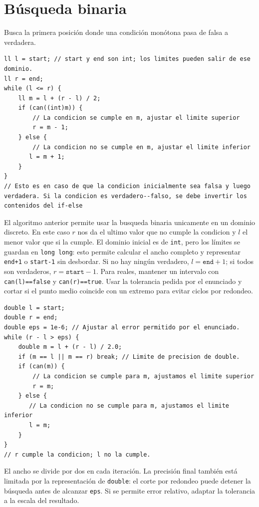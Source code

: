 \section{B\'usqueda binaria}

Busca la primera posici\'on donde una condici\'on mon\'otona pasa de falsa a
verdadera. 



\begin{lstlisting}[style=cpp]
ll l = start; // start y end son int; los limites pueden salir de ese dominio.
ll r = end;
while (l <= r) {
    ll m = l + (r - l) / 2;
    if (can((int)m)) {
        // La condicion se cumple en m, ajustar el limite superior 
        r = m - 1; 
    } else { 
        // La condicion no se cumple en m, ajustar el limite inferior 
       l = m + 1; 
    } 
}
// Esto es en caso de que la condicion inicialmente sea falsa y luego verdadera. Si la condicion es verdadero--falso, se debe invertir los contenidos del if-else
\end{lstlisting}

El algoritmo anterior permite usar la busqueda binaria unicamente en un dominio discreto.
En este caso $r$ nos da el ultimo valor que no cumple la condicion y $l$ el menor valor que si la cumple.
El dominio inicial es de \texttt{int}, pero los l\'imites se guardan en
\texttt{long long}: esto permite calcular el ancho completo y representar
\texttt{end+1} o \texttt{start-1} sin desbordar. Si no hay ning\'un verdadero,
$l=\texttt{end}+1$; si todos son verdaderos, $r=\texttt{start}-1$.
Para reales, mantener un intervalo con \texttt{can(l)==false} y
\texttt{can(r)==true}. Usar la tolerancia pedida por el enunciado y cortar
si el punto medio coincide con un extremo para evitar ciclos por redondeo.

\begin{lstlisting}[style=cpp]
double l = start;
double r = end;
double eps = 1e-6; // Ajustar al error permitido por el enunciado.
while (r - l > eps) {
    double m = l + (r - l) / 2.0;
    if (m == l || m == r) break; // Limite de precision de double.
    if (can(m)) { 
        // La condicion se cumple para m, ajustamos el limite superior 
        r = m; 
    } else { 
       // La condicion no se cumple para m, ajustamos el limite inferior 
       l = m; 
    } 
}
// r cumple la condicion; l no la cumple.
\end{lstlisting}

El ancho se divide por dos en cada iteraci\'on. La precisi\'on final tambi\'en
est\'a limitada por la representaci\'on de \texttt{double}: el corte por
redondeo puede detener la b\'usqueda antes de alcanzar \texttt{eps}.
Si se permite error relativo, adaptar la tolerancia a la escala del resultado.
